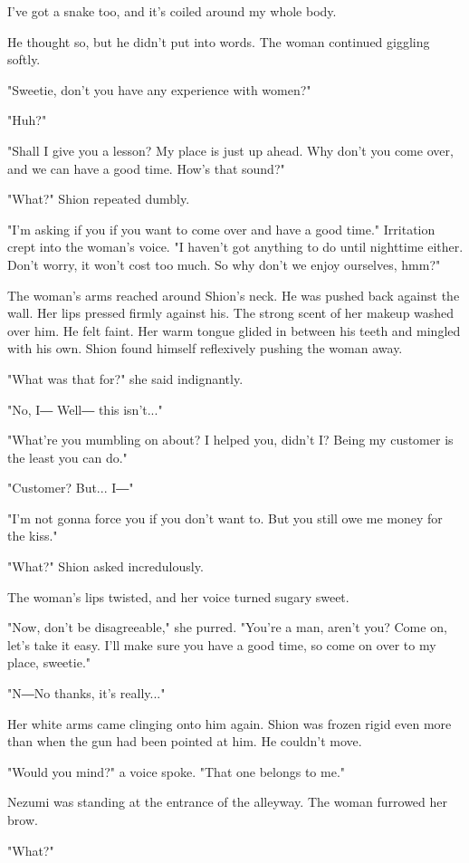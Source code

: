 I've got a snake too, and it's coiled around my whole body.

He thought so, but he didn't put into words. The woman continued
giggling softly.

"Sweetie, don't you have any experience with women?"

"Huh?"

"Shall I give you a lesson? My place is just up ahead. Why don't you
come over, and we can have a good time. How's that sound?"

"What?" Shion repeated dumbly.

"I'm asking if you if you want to come over and have a good time."
Irritation crept into the woman's voice. "I haven't got anything to do
until nighttime either. Don't worry, it won't cost too much. So why
don't we enjoy ourselves, hmm?"

The woman's arms reached around Shion's neck. He was pushed back against
the wall. Her lips pressed firmly against his. The strong scent of her
makeup washed over him. He felt faint. Her warm tongue glided in between
his teeth and mingled with his own. Shion found himself reflexively
pushing the woman away.

"What was that for?" she said indignantly.

"No, I― Well― this isn't..."

"What're you mumbling on about? I helped you, didn't I? Being my
customer is the least you can do."

"Customer? But... I―"

"I'm not gonna force you if you don't want to. But you still owe me
money for the kiss."

"What?" Shion asked incredulously.

The woman's lips twisted, and her voice turned sugary sweet.

"Now, don't be disagreeable," she purred. "You're a man, aren't you?
Come on, let's take it easy. I'll make sure you have a good time, so
come on over to my place, sweetie."

"N―No thanks, it's really..."

Her white arms came clinging onto him again. Shion was frozen rigid even
more than when the gun had been pointed at him. He couldn't move.

"Would you mind?" a voice spoke. "That one belongs to me."

Nezumi was standing at the entrance of the alleyway. The woman furrowed
her brow.

"What?"

